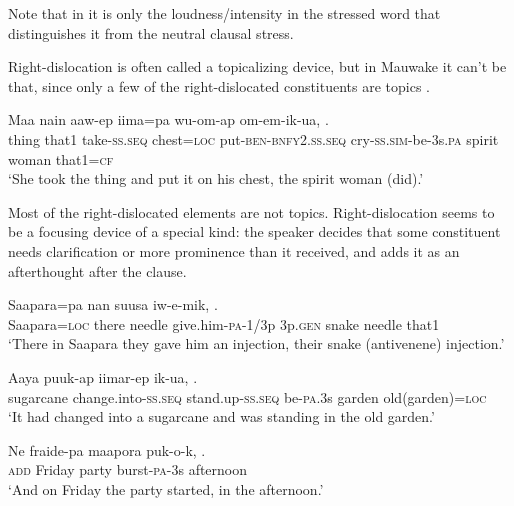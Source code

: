 Note that in  it is only the loudness/intensity in the stressed word that distinguishes it from the neutral clausal stress.

Right-dislocation is often called a topicalizing device, but in Mauwake it can't be that, since only a few of the right-dislocated constituents are topics . 

\ea%
\label{ex:9:x1745}
\gll Maa  nain  aaw-ep  iima=pa  wu-om-ap om-em-ik-ua,      .\\
thing  that1  take-\textsc{ss}.\textsc{seq}  chest=\textsc{loc} put-\textsc{ben}-\textsc{bnfy}2.\textsc{ss}.\textsc{seq} cry-\textsc{ss}.\textsc{sim}-be-3s.\textsc{pa}  spirit  woman  that1=\textsc{cf}\\
\glt`She took the thing and put it on his chest, the spirit woman (did).'
\z


Most of the right-dislocated elements are not topics. Right-dislocation seems to be a focusing device of a special kind: the speaker decides that some constituent needs clarification or more prominence than it received, and adds it as an afterthought after the clause.

\ea%
\label{ex:9:x1746}
\gll Saapara=pa  nan  suusa  iw-e-mik,     .\\
Saapara=\textsc{loc}  there  needle  give.him-\textsc{pa}-1/3p  3p.\textsc{gen}  snake needle  that1\\
\glt`There in Saapara they gave him an injection, their snake (antivenene) injection.'
\z


\ea%
\label{ex:9:x1747}
\gll Aaya puuk-ap iimar-ep ik-ua,   .\\
sugarcane  change.into-\textsc{ss}.\textsc{seq}  stand.up-\textsc{ss}.\textsc{seq} be-\textsc{pa}.3s garden  old(garden)=\textsc{loc}\\
\glt`It had changed into a sugarcane and was standing in the old garden.'
\z


\ea%
\label{ex:9:x1748}
\gll Ne  fraide-pa  maapora  puk-o-k,  .\\
\textsc{add}  Friday  party  burst-\textsc{pa}-3s  afternoon\\
\glt`And on Friday the party started, in the afternoon.'
\z
{}
